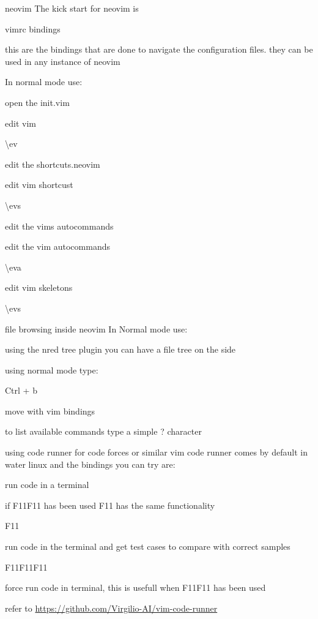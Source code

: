 \begin{section}{neovim}
	The kick start for neovim is
	\begin{subsection}{vimrc bindings}

		this are the bindings that are done to navigate the configuration files. they can be used in any instance of neovim

		In normal mode use:

		open the init.vim
		
		edit vim

		\textbackslash ev

		edit the shortcuts.neovim

		edit vim shortcust

		\textbackslash evs

		edit the vims autocommands

		edit the vim autocommands

		\textbackslash eva

		edit vim skeletons

		\textbackslash evs


	\end{subsection}
	\begin{subsection}{file browsing inside neovim}
		In Normal mode use:

		using the nred tree plugin you can have a file tree on the side

		using normal mode type:

		\<Ctrl\> + b

		move with vim bindings

		to list available commands type a simple ? character

	\end{subsection}
	\begin{subsection}{using code runner for code forces or similar}
		vim code runner comes by default in water linux and the bindings you can try are:
		
		run code in a terminal

		if \<F11\>\<F11\> has been used \<F11\> has the same functionality

		\<F11\>

		run code in the terminal and get test cases to compare with correct samples

		\<F11\>\<F11\>\<F11\>

		force run code in terminal, this is usefull when \<F11\>\<F11\> has been used

		refer to \url{https://github.com/Virgilio-AI/vim-code-runner}


\end{subsection}
\end{section}
